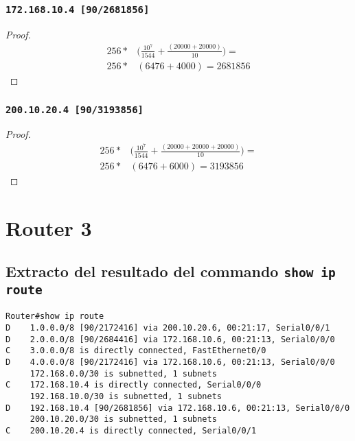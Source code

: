 \documentclass[12pt, times]{simauth}
\begin{document}
\begin{minipage}[t]{0.45\linewidth}  
\subsubsection{\texttt{172.168.10.4 [90/2681856]}}
\begin{proof}
    \begin{align*}
        256 *& \bigg(\frac{10^7}{1544} + \frac{(20000 + 20000)}{10}\bigg) = \\
        256 *& (6476 + 4000) = 2681856
    \end{align*}
\end{proof}
\subsubsection{\texttt{200.10.20.4 [90/3193856]}}
\begin{proof}
\begin{align*}
256 *& \bigg(\frac{10^7}{1544} + \frac{(20000 + 20000 + 20000)}{10}\bigg) = \\
256 *& (6476 + 6000) = 3193856
\end{align*}
\end{proof}
\end{minipage}


\newpage

\section{Router 3}
\subsection{Extracto del resultado del commando \texttt{show ip route}}

\begin{verbatim}
Router#show ip route
D    1.0.0.0/8 [90/2172416] via 200.10.20.6, 00:21:17, Serial0/0/1
D    2.0.0.0/8 [90/2684416] via 172.168.10.6, 00:21:13, Serial0/0/0
C    3.0.0.0/8 is directly connected, FastEthernet0/0
D    4.0.0.0/8 [90/2172416] via 172.168.10.6, 00:21:13, Serial0/0/0
     172.168.0.0/30 is subnetted, 1 subnets
C    172.168.10.4 is directly connected, Serial0/0/0
     192.168.10.0/30 is subnetted, 1 subnets
D    192.168.10.4 [90/2681856] via 172.168.10.6, 00:21:13, Serial0/0/0
     200.10.20.0/30 is subnetted, 1 subnets
C    200.10.20.4 is directly connected, Serial0/0/1 
\end{verbatim}
\end{document}
